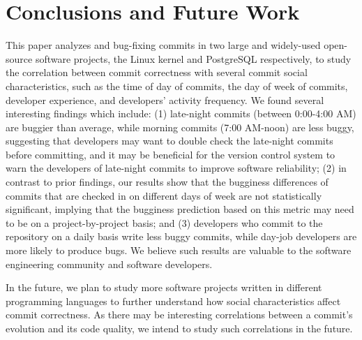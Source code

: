 \section{Conclusions and Future Work}
\label{sec-conclusion}

This paper analyzes \linuxBFC and \postBFC bug-fixing commits in two large and widely-used open-source software projects, 
the Linux kernel and PostgreSQL respectively, to study the correlation between commit correctness with 
several commit social characteristics, such as the time of day of commits,
the day of week of commits, developer experience, and developers' activity
frequency. We found several interesting findings which include: (1)  
late-night commits (between 0:00-4:00 AM) are buggier than average, 
while morning commits (7:00 AM-noon) are less buggy, suggesting 
that developers may want to double check the late-night commits before committing, 
and it may be beneficial for the version control
system to warn the developers of late-night commits to improve software reliability; 
(2) in contrast to prior findings, 
our results show that the bugginess differences of commits that are checked in on different days of week 
are not statistically significant, 
implying that the bugginess prediction based on this 
metric may need to be on a project-by-project basis;
and (3) developers who commit to the repository on a daily basis
write less buggy commits, while day-job developers are more likely to produce
bugs.
%
We believe such results are valuable to the software engineering community and 
software developers. 

In the future, we plan to study more software projects written in different programming languages
to further understand how social characteristics affect commit correctness. 
As there may be interesting correlations between a commit's evolution and its code quality,
we intend to study such correlations in the future.



